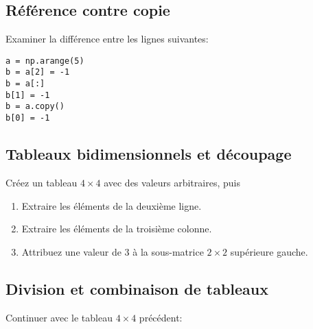 \documentclass[a4paper]{article}
\begin{document}
\subsection{Référence contre copie}
 \noindent Examiner la différence entre les lignes suivantes:
\begin{verbatim}
a = np.arange(5)
b = a[2] = -1
b = a[:]
b[1] = -1
b = a.copy()
b[0] = -1
\end{verbatim}
\subsection{Tableaux bidimensionnels et découpage}
 \noindent Créez un tableau $4\times 4$ avec des valeurs arbitraires, puis
 \begin{enumerate}
\item Extraire les éléments de la deuxième ligne.
\item  Extraire les éléments de la troisième colonne.
\item  Attribuez une valeur de 3 à la sous-matrice $2\times 2$ supérieure gauche.
 \end{enumerate}

\subsection{Division et combinaison de tableaux }
\noindent Continuer avec le tableau $4\times 4$ précédent:
\end{document}
